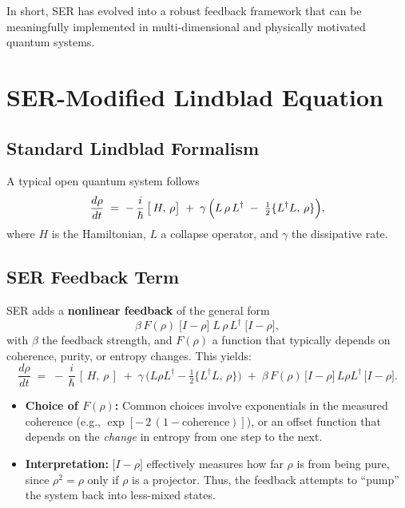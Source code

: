 \documentclass[12pt]{article}
\begin{document}
In short, SER has evolved into a robust feedback framework that can be meaningfully implemented in multi-dimensional and physically motivated quantum systems.

\section{SER-Modified Lindblad Equation}

\subsection{Standard Lindblad Formalism}
A typical open quantum system follows
\begin{equation}
\frac{d\rho}{dt} \;=\; -\,\frac{i}{\hbar}\,\bigl[\,H,\,\rho\bigr]
\;+\;
\gamma\,\Bigl(L\,\rho\,L^\dagger \;-\;\tfrac12\{L^\dagger L,\,\rho\}\Bigr),
\end{equation}
where $H$ is the Hamiltonian, $L$ a collapse operator, and $\gamma$ the dissipative rate.

\subsection{SER Feedback Term}
SER adds a \textbf{nonlinear feedback} of the general form
\[
\beta\,F(\rho)\;\bigl[I - \rho\bigr]\;L\,\rho\,L^\dagger\;\bigl[I - \rho\bigr],
\]
with $\beta$ the feedback strength, and $F(\rho)$ a function that typically depends on coherence, purity, or entropy changes. This yields:
\begin{equation}
\frac{d\rho}{dt}
\;=\;
-\,\frac{i}{\hbar}\,[\,H,\,\rho\,]
\;+\;
\gamma\,\bigl(L\rho L^\dagger - \tfrac12\{L^\dagger L,\,\rho\}\bigr)
\;+\;
\beta\,F(\rho)\,\bigl[I - \rho\bigr]\,L\rho L^\dagger\,\bigl[I - \rho\bigr].
\end{equation}

\begin{itemize}
\item \textbf{Choice of $F(\rho)$:}
Common choices involve exponentials in the measured coherence (e.g., $\exp[-\,2\,(1-\text{coherence})]$), or an offset function that depends on the \emph{change} in entropy from one step to the next.

\item \textbf{Interpretation:}
$\bigl[I - \rho\bigr]$ effectively measures how far $\rho$ is from being pure, since $\rho^2 = \rho$ only if $\rho$ is a projector. Thus, the feedback attempts to ``pump'' the system back into less-mixed states.
\end{itemize}
\end{document}
